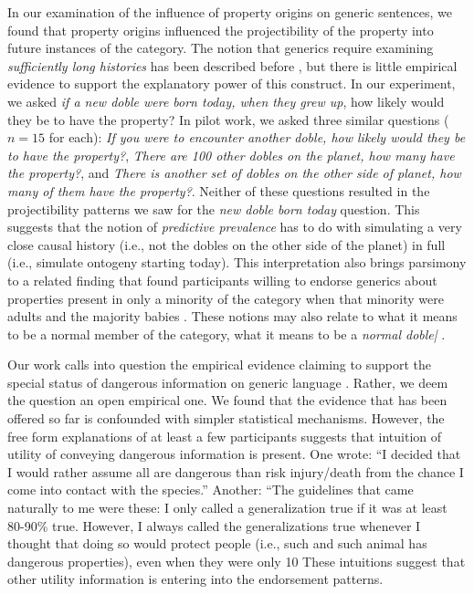 \documentclass[floatsintext, 11pt, doc]{apa6}
\begin{document}
In our examination of the influence of property origins on generic sentences, we found that property origins influenced the projectibility of the property into future instances of the category. 
The notion that generics require examining \emph{sufficiently long histories} has been described before \cite{Cohen1999}, but there is little empirical evidence to support the explanatory power of this construct. 
In our experiment, we asked \emph{if a new doble were born today, when they grew up}, how likely would they be to have the property?
In pilot work, we asked three similar questions ($n=15$ for each): \emph{If you were to encounter another doble, how likely would they be to have the property?}, \emph{There are 100 other dobles on the planet, how many have the property?}, and \emph{There is another set of dobles on the other side of planet, how many of them have the property?}.
Neither of these questions resulted in the projectibility patterns we saw for the \emph{new doble born today} question. 
This suggests that the notion of \emph{predictive prevalence} has to do with simulating a very close causal history (i.e., not the dobles on the other side of the planet) in full (i.e., simulate ontogeny starting today). 
This interpretation also brings parsimony to a related finding that found participants willing to endorse generics about properties present in only a minority of the category when that minority were adults and the majority babies \cite{Cimpian2010theory}.
These notions may also relate to what it means to be a normal member of the category, what it means to be a \emph{normal doble|} \cite{Nickel2008}.

Our work calls into question the empirical evidence claiming to support the special status of dangerous information on generic language \cite{Leslie2008, Cimpian2010}.
Rather, we deem the question an open empirical one. 
We found that the evidence that has been offered so far is confounded with simpler statistical mechanisms. 
However, the free form explanations of at least a few participants suggests that intuition of utility of conveying dangerous information is present. 
One wrote: ``I decided that I would rather assume all are dangerous than risk injury/death from the chance I come into contact with the species.''
Another: ``The guidelines that came naturally to me were these: I only called a generalization true if it was at least 80-90\% true. However, I always called the generalizations true whenever I thought that doing so would protect people (i.e., such and such animal has dangerous properties), even when they were only 10%
These intuitions suggest that other utility information is entering into the endorsement patterns. 
\end{document}
